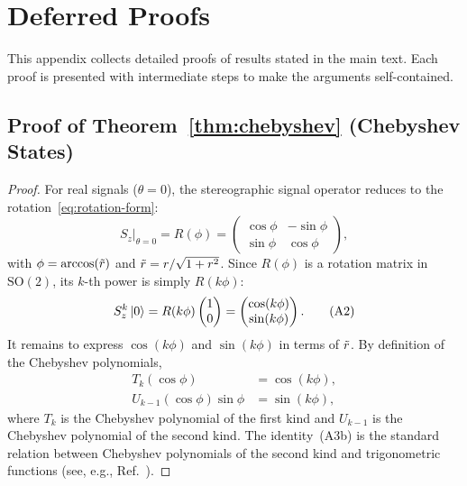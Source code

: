 \appendix

\section{Deferred Proofs}
\label{app:proofs}

This appendix collects detailed proofs of results stated in
the main text.  Each proof is presented with intermediate steps
to make the arguments self-contained.

\subsection*{Proof of Theorem~\ref{thm:chebyshev} (Chebyshev States)}

\begin{proof}
	For real signals ($\theta = 0$), the stereographic signal
	operator reduces to the rotation~\eqref{eq:rotation-form}:
	\begin{equation}
		S_z\big|_{\theta=0} = R(\phi) = \begin{pmatrix} \cos\phi & -\sin\phi \\ \sin\phi & \cos\phi \end{pmatrix},
		\tag{A1}
	\end{equation}
	with $\phi = \arccos(\tilde{r})$ and
	$\tilde{r} = r/\sqrt{1+r^2}$.  Since $R(\phi)$ is a
	rotation matrix in $\mathrm{SO}(2)$, its $k$-th power is simply
	$R(k\phi)$:
	\begin{equation}
		S_z^k\ket{0} = R(k\phi)\begin{pmatrix}1\\0\end{pmatrix} = \begin{pmatrix} \cos(k\phi) \\ \sin(k\phi) \end{pmatrix}.
		\tag{A2}
	\end{equation}
	It remains to express $\cos(k\phi)$ and $\sin(k\phi)$
	in terms of $\tilde{r}$.  By definition of the Chebyshev
	polynomials,
	\begin{align}
		T_k(\cos\phi)             & = \cos(k\phi), \tag{A3a} \\
		U_{k-1}(\cos\phi)\sin\phi & = \sin(k\phi), \tag{A3b}
	\end{align}
	where $T_k$ is the Chebyshev polynomial of the first kind
	and $U_{k-1}$ is the Chebyshev polynomial of the second kind.
	The identity~(A3b) is the standard relation between
	Chebyshev polynomials of the second kind and trigonometric
	functions (see, e.g., Ref.~\cite{BenentiCasatiStrini2004}).


\end{proof}
